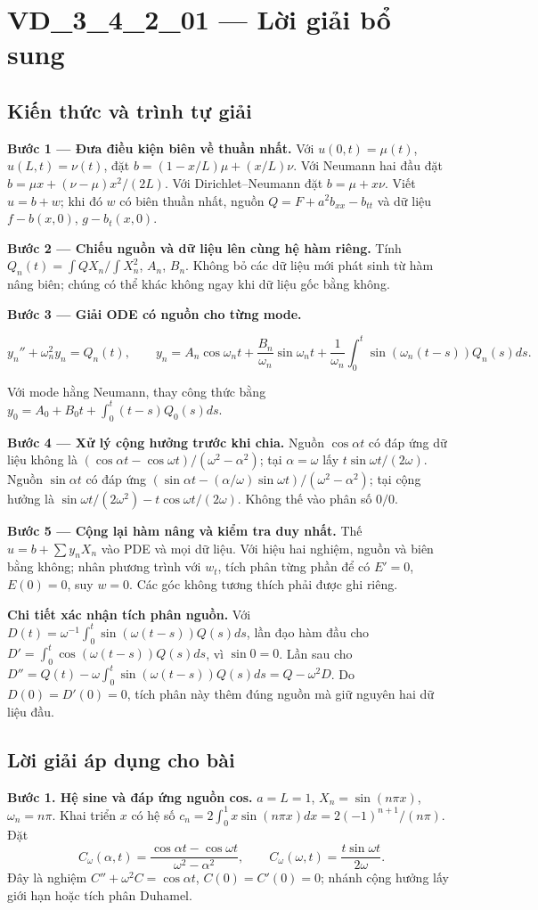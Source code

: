 \documentclass[10pt,a4paper]{article}
\begin{document}
\section*{VD\_3\_4\_2\_01 — Lời giải bổ sung}
\subsection*{Kiến thức và trình tự giải}
\textbf{Bước 1 — Đưa điều kiện biên về thuần nhất.} Với $u(0,t)=\mu(t)$, $u(L,t)=\nu(t)$, đặt $b=(1-x/L)\mu+(x/L)\nu$. Với Neumann hai đầu đặt $b=\mu x+(\nu-\mu)x^2/(2L)$. Với Dirichlet–Neumann đặt $b=\mu+x\nu$. Viết $u=b+w$; khi đó $w$ có biên thuần nhất, nguồn $Q=F+a^2b_{xx}-b_{tt}$ và dữ liệu $f-b(x,0)$, $g-b_t(x,0)$.

\textbf{Bước 2 — Chiếu nguồn và dữ liệu lên cùng hệ hàm riêng.} Tính $Q_n(t)=\int QX_n/\int X_n^2$, $A_n$, $B_n$. Không bỏ các dữ liệu mới phát sinh từ hàm nâng biên; chúng có thể khác không ngay khi dữ liệu gốc bằng không.

\textbf{Bước 3 — Giải ODE có nguồn cho từng mode.}


\[
y_n''+\omega_n^2y_n=Q_n(t),\qquad
y_n=A_n\cos\omega_nt+\frac{B_n}{\omega_n}\sin\omega_nt+\frac1{\omega_n}\int_0^t\sin(\omega_n(t-s))Q_n(s)ds.
\]


Với mode hằng Neumann, thay công thức bằng $y_0=A_0+B_0t+\int_0^t(t-s)Q_0(s)ds$.

\textbf{Bước 4 — Xử lý cộng hưởng trước khi chia.} Nguồn $\cos\alpha t$ có đáp ứng dữ liệu không là $(\cos\alpha t-\cos\omega t)/(\omega^2-\alpha^2)$; tại $\alpha=\omega$ lấy $t\sin\omega t/(2\omega)$. Nguồn $\sin\alpha t$ có đáp ứng $(\sin\alpha t-(\alpha/\omega)\sin\omega t)/(\omega^2-\alpha^2)$; tại cộng hưởng là $\sin\omega t/(2\omega^2)-t\cos\omega t/(2\omega)$. Không thế vào phân số $0/0$.

\textbf{Bước 5 — Cộng lại hàm nâng và kiểm tra duy nhất.} Thế $u=b+\sum y_nX_n$ vào PDE và mọi dữ liệu. Với hiệu hai nghiệm, nguồn và biên bằng không; nhân phương trình với $w_t$, tích phân từng phần để có $E'=0$, $E(0)=0$, suy $w=0$. Các góc không tương thích phải được ghi riêng.

\textbf{Chi tiết xác nhận tích phân nguồn.} Với $D(t)=\omega^{-1}\int_0^t\sin(\omega(t-s))Q(s)ds$, lần đạo hàm đầu cho $D'=\int_0^t\cos(\omega(t-s))Q(s)ds$, vì $\sin0=0$. Lần sau cho $D''=Q(t)-\omega\int_0^t\sin(\omega(t-s))Q(s)ds=Q-\omega^2D$. Do $D(0)=D'(0)=0$, tích phân này thêm đúng nguồn mà giữ nguyên hai dữ liệu đầu.
\subsection*{Lời giải áp dụng cho bài}
\textbf{Bước 1. Hệ sine và đáp ứng nguồn cos.} $a=L=1$, $X_n=\sin(n\pi x)$, $\omega_n=n\pi$. Khai triển $x$ có hệ số $c_n=2\int_0^1x\sin(n\pi x)dx=2(-1)^{n+1}/(n\pi)$. Đặt
\[C_\omega(\alpha,t)=\frac{\cos\alpha t-\cos\omega t}{\omega^2-\alpha^2},\qquad
C_\omega(\omega,t)=\frac{t\sin\omega t}{2\omega}.\]
Đây là nghiệm $C''+\omega^2C=\cos\alpha t$, $C(0)=C'(0)=0$; nhánh cộng hưởng lấy giới hạn hoặc tích phân Duhamel.
\end{document}
